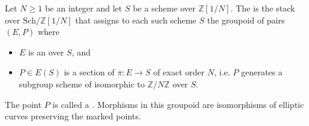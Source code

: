 \begin{definition} \label{definition:moduli_stack_of_elliptic_curves_with_point_of_order_N}
Let $N \geq 1$ be an integer and let $S$ be a scheme over $\mathbb{Z}[1/N]$. The  is the stack over $\mathrm{Sch}/\mathbb{Z}[1/N]$ that assigns to each such scheme $S$ the groupoid of pairs $(E, P)$ where
\begin{itemize}
    \item $E$ is an  over $S$, and
    \item $P \in E(S)$ is a section of $\pi: E \to S$ of exact order $N$, i.e. $P$ generates a subgroup scheme of  isomorphic to $\mathbb{Z}/N\mathbb{Z}$ over $S$.
\end{itemize}
The point $P$ is called a . Morphisms in this groupoid are isomorphisms of elliptic curves preserving the marked points.
\end{definition}
